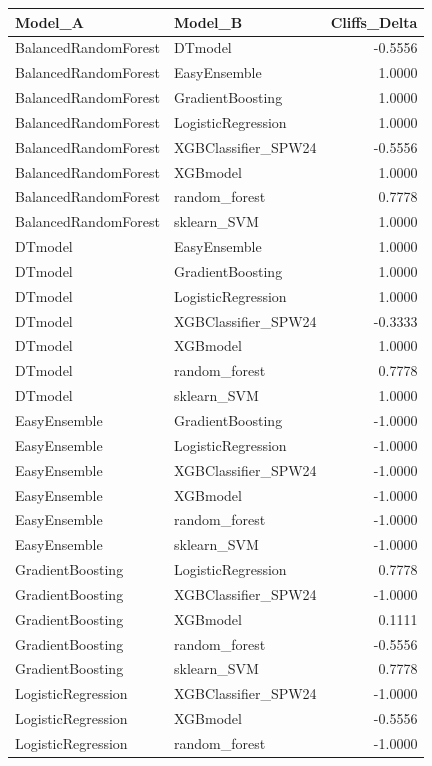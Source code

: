 \begin{table}[t]
\centering
\begin{tabular}{llr}
\toprule
Model_A & Model_B & Cliffs_Delta \\
\midrule
BalancedRandomForest & DTmodel & -0.5556 \\
BalancedRandomForest & EasyEnsemble & 1.0000 \\
BalancedRandomForest & GradientBoosting & 1.0000 \\
BalancedRandomForest & LogisticRegression & 1.0000 \\
BalancedRandomForest & XGBClassifier_SPW24 & -0.5556 \\
BalancedRandomForest & XGBmodel & 1.0000 \\
BalancedRandomForest & random_forest & 0.7778 \\
BalancedRandomForest & sklearn_SVM & 1.0000 \\
DTmodel & EasyEnsemble & 1.0000 \\
DTmodel & GradientBoosting & 1.0000 \\
DTmodel & LogisticRegression & 1.0000 \\
DTmodel & XGBClassifier_SPW24 & -0.3333 \\
DTmodel & XGBmodel & 1.0000 \\
DTmodel & random_forest & 0.7778 \\
DTmodel & sklearn_SVM & 1.0000 \\
EasyEnsemble & GradientBoosting & -1.0000 \\
EasyEnsemble & LogisticRegression & -1.0000 \\
EasyEnsemble & XGBClassifier_SPW24 & -1.0000 \\
EasyEnsemble & XGBmodel & -1.0000 \\
EasyEnsemble & random_forest & -1.0000 \\
EasyEnsemble & sklearn_SVM & -1.0000 \\
GradientBoosting & LogisticRegression & 0.7778 \\
GradientBoosting & XGBClassifier_SPW24 & -1.0000 \\
GradientBoosting & XGBmodel & 0.1111 \\
GradientBoosting & random_forest & -0.5556 \\
GradientBoosting & sklearn_SVM & 0.7778 \\
LogisticRegression & XGBClassifier_SPW24 & -1.0000 \\
LogisticRegression & XGBmodel & -0.5556 \\
LogisticRegression & random_forest & -1.0000 \\

\end{tabular}
\end{table}
